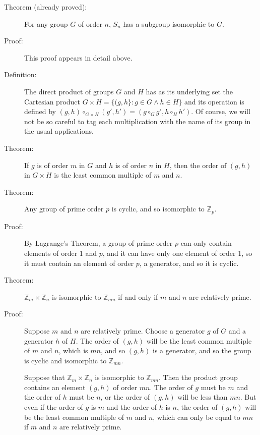 \documentclass[12pt]{article}
\begin{document}
\begin{description}
\item[Theorem (already proved):]  For any group $G$ of order $n$, $S_n$ has a subgroup isomorphic to $G$.

\item[Proof:]  This proof appears in detail above.

\item[Definition:]  The direct product of groups $G$ and $H$ has as its underlying set the Cartesian product $G \times H = \{(g,h\}:g \in G \wedge h \in H\}$ and its operation is
defined by $(g,h) \circ_{G \times H} (g',h') = (g \circ_G g',h \circ_H h')$.  Of course, we will not be so careful to tag each multiplication with the name of its group in the usual applications.

\item[Theorem:]  If $g$ is of order $m$ in $G$ and $h$ is of order $n$ in $H$, then the order of $(g,h)$ in $G \times H$ is the least common multiple of $m$ and $n$.

\item[Theorem:]  Any group of prime order $p$ is cyclic, and so isomorphic to ${\mathbb Z}_p$.

\item[Proof:]  By Lagrange's Theorem, a group of prime order $p$ can only contain elements of order 1 and $p$, and it can have only one element of order 1,
so it must contain an element of order $p$, a generator, and so it is cyclic.

\item[Theorem:]  ${\mathbb Z}_m \times {\mathbb Z}_n$ is isomorphic to ${\mathbb Z}_{mn}$ if and only if $m$ and $n$ are relatively prime.

\item[Proof:]  Suppose $m$ and $n$ are relatively prime. Choose a generator $g$ of $G$ and a generator $h$ of $H$.  The order of $(g,h)$ will be the least common multiple of $m$ and $n$,
which is $mn$, and so $(g,h)$ is a generator, and so the group is cyclic and isomorphic to ${\mathbb Z}_{mn}$.

Suppose that ${\mathbb Z}_m \times {\mathbb Z}_n$ is isomorphic to ${\mathbb Z}_{mn}$.  Then the product group contains an element $(g,h)$ of order $mn$.  The order of $g$ must be $m$
and the order of $h$ must be $n$, or the order of $(g,h)$ will be less than $mn$.  But even if the order of $g$ is $m$ and the order of $h$ is $n$, the order of $(g,h)$ will be the least common multiple of $m$ and $n$, which can only be equal to $mn$ if $m$ and $n$ are
relatively prime.

\end{description}
\end{document}
